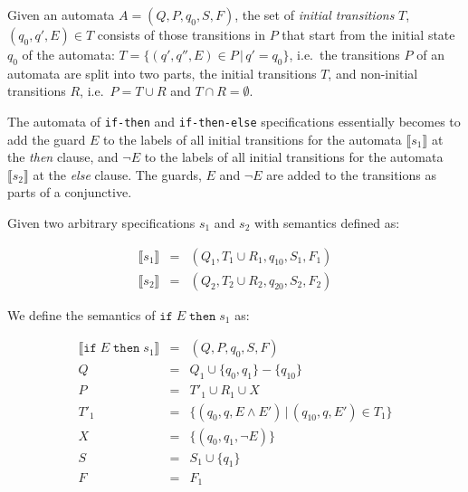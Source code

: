 \begin{mydef}\label{def-initial-transitions}
Given an automata $A = (Q, P, q_0, S, F)$, the set of \textit{initial
transitions} $T$, $(q_0, q', E) \in T$ consists of those transitions in $P$
that start from the initial state $q_0$ of the automata: $T = \{(q', q'', E)
\in P \, | \, q' = q_0 \}$, i.e.\ the transitions $P$ of an automata are split
into two parts, the initial transitions $T$, and non-initial transitions $R$,
i.e.\ $P = T \cup R$ and $T \cap R = \emptyset$.
\end{mydef}

The automata of \texttt{if-then} and \texttt{if-then-else} specifications
essentially becomes to add the guard $E$ to the labels of all initial
transitions for the automata $\llbracket s_1 \rrbracket$ at the \textit{then}
clause, and $\neg E$ to the labels of all initial transitions for the automata
$\llbracket s_2 \rrbracket$ at the \textit{else} clause. The guards, $E$ and
$\neg E$ are added to the transitions as parts of a conjunctive.

Given two arbitrary specifications $s_1$ and $s_2$ with semantics defined as:

\medskip
\[
  \begin{array}{rcl}
    \llbracket s_1 \rrbracket & = & (Q_1, T_1 \cup R_1, q_{10}, S_1, F_1) \\
    \llbracket s_2 \rrbracket & = & (Q_2, T_2 \cup R_2, q_{20}, S_2, F_2)
  \end{array}
\]
\medskip

We define the semantics of $\texttt{if} \; E \; \texttt{then} \; s_1$ as:

\medskip
\[
  \begin{array}{rcl}
  \llbracket \texttt{if} \; E \; \texttt{then} \; s_1 \rrbracket & = & (Q, P, q_0, S, F) \\
                        Q & = & Q_1 \cup \{q_0, q_1\} - \{q_{10}\} \\
                        P & = & T'_1 \cup R_1 \cup X \\
                     T'_1 & = & \{(q_0, q, E       \wedge E') \, | \, (q_{10}, q, E') \in T_1\} \\
                        X & = & \{(q_0, q_1, \neg E)\} \\
                        S & = & S_1 \cup \{q_1\} \\
                        F & = & F_1
  \end{array}
\]
\medskip


